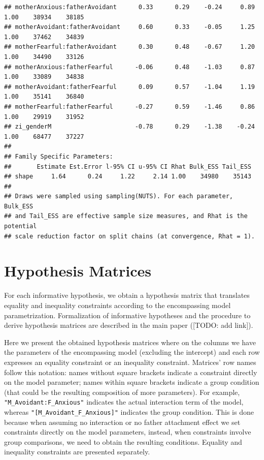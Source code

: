 \documentclass[
]{book}
\begin{document}
\begin{verbatim}
## motherAnxious:fatherAvoidant      0.33      0.29    -0.24     0.89 1.00    38934    38185
## motherAvoidant:fatherAvoidant     0.60      0.33    -0.05     1.25 1.00    37462    34839
## motherFearful:fatherAvoidant      0.30      0.48    -0.67     1.20 1.00    34490    33126
## motherAnxious:fatherFearful      -0.06      0.48    -1.03     0.87 1.00    33089    34838
## motherAvoidant:fatherFearful      0.09      0.57    -1.04     1.19 1.00    35141    36840
## motherFearful:fatherFearful      -0.27      0.59    -1.46     0.86 1.00    29919    31952
## zi_genderM                       -0.78      0.29    -1.38    -0.24 1.00    68477    37227
## 
## Family Specific Parameters: 
##       Estimate Est.Error l-95% CI u-95% CI Rhat Bulk_ESS Tail_ESS
## shape     1.64      0.24     1.22     2.14 1.00    34980    35143
## 
## Draws were sampled using sampling(NUTS). For each parameter, Bulk_ESS
## and Tail_ESS are effective sample size measures, and Rhat is the potential
## scale reduction factor on split chains (at convergence, Rhat = 1).
\end{verbatim}

\hypertarget{hypothesis-matrices}{%
\section{Hypothesis Matrices}\label{hypothesis-matrices}}

For each informative hypothesis, we obtain a hypothesis matrix that translates equality and inequality constraints according to the encompassing model parametrization. Formalization of informative hypotheses and the procedure to derive hypothesis matrices are described in the main paper ({[}TODO: add link{]}).

Here we present the obtained hypothesis matrices where on the columns we have the parameters of the encompassing model (excluding the intercept) and each row expresses an equality constraint or an inequality constraint. Matrices' row names follow this notation: names without square brackets indicate a constraint directly on the model parameter; names within square brackets indicate a group condition (that could be the resulting composition of more parameters). For example, \texttt{"M\_Avoidant:F\_Anxious"} indicates the actual interaction term of the model, whereas \texttt{"{[}M\_Avoidant\_F\_Anxious{]}"} indicates the group condition. This is done because when assuming no interaction or no father attachment effect we set constraints directly on the model parameters, instead, when constraints involve group comparisons, we need to obtain the resulting conditions. Equality and inequality constraints are presented separately.
\end{document}
